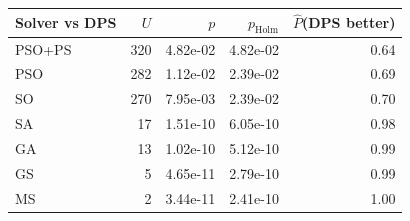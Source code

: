 \begin{tabular}{lrrrr}
\toprule
Solver vs DPS & $U$ & $p$ & $p_{\mathrm{Holm}}$ & $\hat{P}$(DPS better)\\
\midrule
PSO+PS & 320 & 4.82e-02 & 4.82e-02 & 0.64\\
PSO & 282 & 1.12e-02 & 2.39e-02 & 0.69\\
SO & 270 & 7.95e-03 & 2.39e-02 & 0.70\\
SA & 17 & 1.51e-10 & 6.05e-10 & 0.98\\
GA & 13 & 1.02e-10 & 5.12e-10 & 0.99\\
GS & 5 & 4.65e-11 & 2.79e-10 & 0.99\\
MS & 2 & 3.44e-11 & 2.41e-10 & 1.00\\
\bottomrule
\end{tabular}
